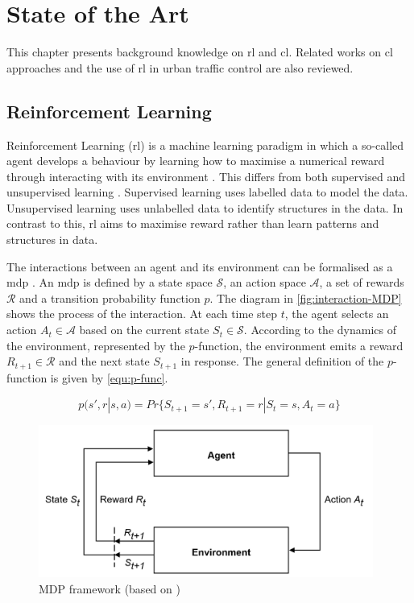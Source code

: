 \chapter{State of the Art}

This chapter presents background knowledge on \gls{rl} and \gls{cl}. Related works on \gls{cl} approaches and the use of \gls{rl} in urban traffic control are also reviewed.

\section{Reinforcement Learning}

Reinforcement Learning (\gls{rl}) is a machine learning paradigm in which a so-called agent develops a behaviour by learning how to maximise a numerical reward through interacting with its environment \parencite{SuttonBarto_2018}. This differs from both supervised and unsupervised learning \parencite{Yang_2019}. Supervised learning uses labelled data to model the data. Unsupervised learning uses unlabelled data to identify structures in the data. In contrast to this, \gls{rl} aims to maximise reward rather than learn patterns and structures in data.

The interactions between an agent and its environment can be formalised as a \gls{mdp} \parencite{SuttonBarto_2018}. An \gls{mdp} is defined by a state space $\mathcal{S}$, an action space $\mathcal{A}$, a set of rewards $\mathcal{R}$ and a transition probability function $p$. The diagram in \autoref{fig:interaction-MDP} shows the process of the interaction. At each time step $t$, the agent selects an action $A_t\in \mathcal{A}$ based on the current state $S_t \in \mathcal{S}$. According to the dynamics of the environment, represented by the $p$-function, the environment emits a reward $R_{t+1} \in \mathcal{R}$ and the next state $S_{t+1}$ in response.
The general definition of the $p$-function is given by \autoref{equ:p-func}.

\begin{equation}
\label{equ:p-func}
p(s', r|s, a)=Pr\lbrace S_{t+1}=s', R_{t+1}=r|S_t=s, A_t=a\rbrace
\end{equation}


\begin{figure}[H]
\centering
\includegraphics[height=5cm]{img/agent-env_MDP.png}
\caption{MDP framework (based on \textcite{SuttonBarto_2018})}
\label{fig:interaction-MDP}
\end{figure}

